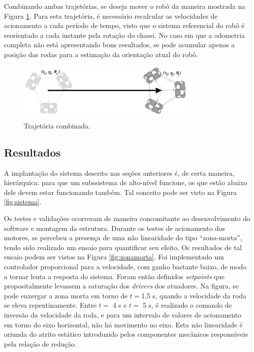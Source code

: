 Combinando ambas trajetórias, se deseja mover o robô da maneira mostrada na Figura \ref{fig:hibrida}. Para esta trajetória, é necessário recalcular as velocidades de acionamento a cada período de tempo, visto que o sistema referencial do robô é reorientado a cada instante pela rotação do chassi. No caso em que a odometria completa não está apresentando bons resultados, se pode acumular apenas a posição das rodas para a estimação da orientação atual do robô.

\begin{figure}[h]
  \centering
  \includegraphics[width = 0.8\textwidth]{imagens/hibrida}
  \caption{Trajetória combinada.}
  \label{fig:hibrida}
\end{figure}

\subsection{Resultados}
\label{sec:resultados}

A implantação do sistema descrito nas seções anteriores é, de certa maneira, hierárquica: para que um subssistema de alto-nível funcione, os que estão abaixo dele devem estar funcionando também. Tal conceito pode ser visto na Figura \ref{fig:sistema}.

Os testes e validações ocorreram de maneira concomitante ao desenvolvimento do software e montagem da estrutura. Durante os testes de acionamento dos motores, se percebeu a presença de uma não linearidade do tipo ``zona-morta'', tendo sido realizado um ensaio para quantificar seu efeito. Os resultados de tal ensaio podem ser vistos na Figura \ref{fig:zonamorta}. Foi implementado um controlador proporcional para a velocidade, com ganho bastante baixo, de modo a tornar lenta a resposta do sistema. Foram então definidos \emph{setpoints} que propositalmente levassem a saturação dos \textit{drivers} dos atuadores. Na figura, se pode enxergar a zona morta em torno de $t=$1,5 s, quando a velocidade da roda se eleva repentinamente. Entre $t=$ 4 s e $t=$ 5 s, é realizado o comando de inversão da velocidade da roda, e para um intervalo de valores de acionamento em torno do eixo horizontal, não há movimento no eixo. Esta não linearidade é oriunda do atrito estático introduzido pelos componentes mecânicos responsáveis pela relação de redução.

